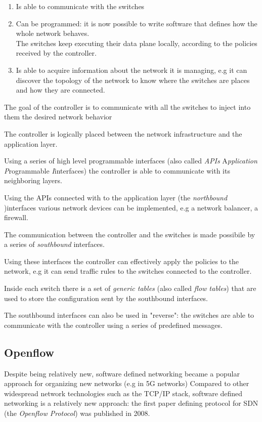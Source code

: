 \documentclass{article}
\begin{document}
	\begin{enumerate}
		\item Is able to communicate with the switches
		\item Can be programmed: it is now possible to write software that defines how the whole network behaves. \\
		The switches keep executing their data plane locally, according to the policies received by the controller.
		\item Is able to acquire information about the network it is managing, e.g it can discover the topology of the network to know where the switches are places and how they are connected.
	\end{enumerate}
	
	The goal of the controller is to communicate with all the switches to inject into them the desired network behavior
	
	The controller is logically placed between the network infrastructure and the application layer.
	
	Using a series of high level programmable interfaces  (also called \textit{APIs} A\textit{pplication} \textit{P}rogrammable \textit{I}interfaces) the controller is able to communicate with its neighboring layers.
	
	
	Using the APIs connected with to the application layer (the \textit{northbound })interfaces various network devices can be implemented, e.g a network balancer, a firewall.
	
	The communication between the controller and the switches is made possibile by a series of \textit{southbound} interfaces.
	
	Using these interfaces the controller can effectively apply the policies to the network, e.g it can send traffic rules to the switches connected to the controller.
	
	Inside each switch there is a set of \textit{generic tables} (also called \textit{flow tables}) that are used to store the configuration sent by the southbound interfaces.
	
	The southbound interfaces can also be used in "reverse": the switches are able to communicate with the controller using a series of predefined messages.
	
	
	
	\subsection{Openflow}
	Despite being relatively new, software defined networking became a popular approach for organizing new networks (e.g in 5G networks)
	Compared to other widespread network technologies such as the TCP/IP stack, software defined networking is a relatively new approach: the first paper defining protocol for SDN (the \textit{Openflow Protocol}) was published in 2008.
	
\end{document}
